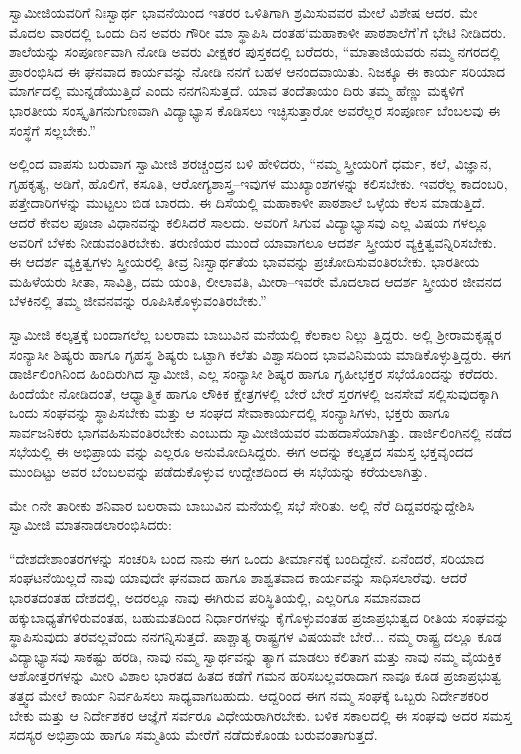 ಸ್ವಾಮೀಜಿಯವರಿಗೆ ನಿಃಸ್ವಾರ್ಥ ಭಾವನೆಯಿಂದ ಇತರರ ಒಳಿತಿಗಾಗಿ ಶ್ರಮಿಸುವವರ ಮೇಲೆ ವಿಶೇಷ ಆದರ. ಮೇ ಮೊದಲ ವಾರದಲ್ಲಿ ಒಂದು ದಿನ ಅವರು ಗೌರೀ ಮಾ ಸ್ಥಾಪಿಸಿ ದಂತಹ‘ಮಹಾಕಾಳೀ ಪಾಠಶಾಲೆಗೆ’ಗೆ ಭೇಟಿ ನೀಡಿದರು. ಶಾಲೆಯನ್ನು ಸಂಪೂರ್ಣವಾಗಿ ನೋಡಿ ಅವರು ವೀಕ್ಷಕರ ಪುಸ್ತಕದಲ್ಲಿ ಬರೆದರು, “ಮಾತಾಜಿಯವರು ನಮ್ಮ ನಗರದಲ್ಲಿ ಪ್ರಾರಂಭಿಸಿದ ಈ ಘನವಾದ ಕಾರ್ಯವನ್ನು ನೋಡಿ ನನಗೆ ಬಹಳ ಆನಂದವಾಯಿತು. ನಿಜಕ್ಕೂ ಈ ಕಾರ್ಯ ಸರಿಯಾದ ಮಾರ್ಗದಲ್ಲಿ ಮುನ್ನಡೆಯುತ್ತಿದೆ ಎಂದು ನನಗನಿಸುತ್ತದೆ. ಯಾವ ತಂದೆತಾಯಂ ದಿರು ತಮ್ಮ ಹೆಣ್ಣು ಮಕ್ಕಳಿಗೆ ಭಾರತೀಯ ಸಂಸ್ಕೃತಿಗನುಗುಣವಾಗಿ ವಿದ್ಯಾಭ್ಯಾಸ ಕೊಡಿಸಲು ಇಚ್ಛಿಸುತ್ತಾರೋ ಅವರೆಲ್ಲರ ಸಂಪೂರ್ಣ ಬೆಂಬಲವು ಈ ಸಂಸ್ಥೆಗೆ ಸಲ್ಲಬೇಕು.”

ಅಲ್ಲಿಂದ ವಾಪಸು ಬರುವಾಗ ಸ್ವಾಮೀಜಿ ಶರಚ್ಚಂದ್ರನ ಬಳಿ ಹೇಳಿದರು, “ನಮ್ಮ ಸ್ತ್ರೀಯರಿಗೆ ಧರ್ಮ, ಕಲೆ, ವಿಜ್ಞಾನ, ಗೃಹಕೃತ್ಯ, ಅಡಿಗೆ, ಹೊಲಿಗೆ, ಕಸೂತಿ, ಆರೋಗ್ಯಶಾಸ್ತ್ರ–ಇವುಗಳ ಮುಖ್ಯಾಂಶಗಳನ್ನು ಕಲಿಸಬೇಕು. ಇವರೆಲ್ಲ ಕಾದಂಬರಿ, ಪತ್ತೇದಾರಿಗಳನ್ನು ಮುಟ್ಟಲು ಬಿಡ ಬಾರದು. ಈ ದಿಸೆಯಲ್ಲಿ ಮಹಾಕಾಳೀ ಪಾಠಶಾಲೆ ಒಳ್ಳೆಯ ಕೆಲಸ ಮಾಡುತ್ತಿದೆ. ಆದರೆ ಕೇವಲ ಪೂಜಾ ವಿಧಾನವನ್ನು ಕಲಿಸಿದರೆ ಸಾಲದು. ಅವರಿಗೆ ಸಿಗುವ ವಿದ್ಯಾಭ್ಯಾಸವು ಎಲ್ಲ ವಿಷಯ ಗಳಲ್ಲೂ ಅವರಿಗೆ ಬೆಳಕು ನೀಡುವಂತಿರಬೇಕು. ತರುಣಿಯರ ಮುಂದೆ ಯಾವಾಗಲೂ ಆದರ್ಶ ಸ್ತ್ರೀಯರ ವ್ಯಕ್ತಿತ್ವವನ್ನಿರಿಸಬೇಕು. ಈ ಆದರ್ಶ ವ್ಯಕ್ತಿತ್ವಗಳು ಸ್ತ್ರೀಯರಲ್ಲಿ ತೀವ್ರ ನಿಃಸ್ವಾರ್ಥತೆಯ ಭಾವವನ್ನು ಪ್ರಚೋದಿಸುವಂತಿರಬೇಕು. ಭಾರತೀಯ ಮಹಿಳೆಯರು ಸೀತಾ, ಸಾವಿತ್ರಿ, ದಮ ಯಂತಿ, ಲೀಲಾವತಿ, ಮೀರಾ–ಇವರೇ ಮೊದಲಾದ ಆದರ್ಶ ಸ್ತ್ರೀಯರ ಜೀವನದ ಬೆಳಕಿನಲ್ಲಿ ತಮ್ಮ ಜೀವನವನ್ನು ರೂಪಿಸಿಕೊಳ್ಳುವಂತಿರಬೇಕು.”

ಸ್ವಾಮೀಜಿ ಕಲ್ಕತ್ತಕ್ಕೆ ಬಂದಾಗಲೆಲ್ಲ ಬಲರಾಮ ಬಾಬುವಿನ ಮನೆಯಲ್ಲಿ ಕೆಲಕಾಲ ನಿಲ್ಲು ತ್ತಿದ್ದರು. ಅಲ್ಲಿ ಶ್ರೀರಾಮಕೃಷ್ಣರ ಸಂನ್ಯಾಸೀ ಶಿಷ್ಯರು ಹಾಗೂ ಗೃಹಸ್ಥ ಶಿಷ್ಯರು ಒಟ್ಟಾಗಿ ಕಲೆತು ವಿಶ್ವಾಸದಿಂದ ಭಾವವಿನಿಮಯ ಮಾಡಿಕೊಳ್ಳುತ್ತಿದ್ದರು. ಈಗ ಡಾರ್ಜಿಲಿಂಗಿನಿಂದ ಹಿಂದಿರುಗಿದ ಸ್ವಾಮೀಜಿ, ಎಲ್ಲ ಸಂನ್ಯಾಸೀ ಶಿಷ್ಯರ ಹಾಗೂ ಗೃಹೀಭಕ್ತರ ಸಭೆಯೊಂದನ್ನು ಕರೆದರು. ಹಿಂದೆಯೇ ನೋಡಿದಂತೆ, ಆಧ್ಯಾತ್ಮಿಕ ಹಾಗೂ ಲೌಕಿಕ ಕ್ಷೇತ್ರಗಳಲ್ಲಿ ಬೇರೆ ಬೇರೆ ಸ್ತರಗಳಲ್ಲಿ ಜನಸೇವೆ ಸಲ್ಲಿಸುವುದಕ್ಕಾಗಿ ಒಂದು ಸಂಘವನ್ನು ಸ್ಥಾಪಿಸಬೇಕು ಮತ್ತು ಆ ಸಂಘದ ಸೇವಾಕಾರ್ಯದಲ್ಲಿ ಸಂನ್ಯಾಸಿಗಳು, ಭಕ್ತರು ಹಾಗೂ ಸಾರ್ವಜನಿಕರು ಭಾಗವಹಿಸುವಂತಿರಬೇಕು ಎಂಬುದು ಸ್ವಾಮೀಜಿಯವರ ಮಹದಾಸೆಯಾಗಿತ್ತು. ಡಾರ್ಜಿಲಿಂಗಿನಲ್ಲಿ ನಡೆದ ಸಭೆಯಲ್ಲಿ ಈ ಅಭಿಪ್ರಾಯ ವನ್ನು ಎಲ್ಲರೂ ಅನುಮೋದಿಸಿದ್ದರು. ಈಗ ಅದನ್ನು ಕಲ್ಕತ್ತದ ಸಮಸ್ತ ಭಕ್ತವೃಂದದ ಮುಂದಿಟ್ಟು ಅವರ ಬೆಂಬಲವನ್ನು ಪಡೆದುಕೊಳ್ಳುವ ಉದ್ದೇಶದಿಂದ ಈ ಸಭೆಯನ್ನು ಕರೆಯಲಾಗಿತ್ತು.

ಮೇ ೧ನೇ ತಾರೀಕು ಶನಿವಾರ ಬಲರಾಮ ಬಾಬುವಿನ ಮನೆಯಲ್ಲಿ ಸಭೆ ಸೇರಿತು. ಅಲ್ಲಿ ನೆರೆ ದಿದ್ದವರನ್ನುದ್ದೇಶಿಸಿ ಸ್ವಾಮೀಜಿ ಮಾತನಾಡಲಾರಂಭಿಸಿದರು:

“ದೇಶದೇಶಾಂತರಗಳನ್ನು ಸಂಚರಿಸಿ ಬಂದ ನಾನು ಈಗ ಒಂದು ತೀರ್ಮಾನಕ್ಕೆ ಬಂದಿದ್ದೇನೆ. ಏನೆಂದರೆ, ಸರಿಯಾದ ಸಂಘಟನೆಯಿಲ್ಲದೆ ನಾವು ಯಾವುದೇ ಘನವಾದ ಹಾಗೂ ಶಾಶ್ವತವಾದ ಕಾರ್ಯವನ್ನು ಸಾಧಿಸಲಾರೆವು. ಆದರೆ ಭಾರತದಂತಹ ದೇಶದಲ್ಲಿ, ಅದರಲ್ಲೂ ನಾವು ಈಗಿರುವ ಪರಿಸ್ಥಿತಿಯಲ್ಲಿ, ಎಲ್ಲರಿಗೂ ಸಮಾನವಾದ ಹಕ್ಕುಬಾಧ್ಯತೆಗಳಿರುವಂತಹ, ಬಹುಮತದಿಂದ ನಿರ್ಧಾರಗಳನ್ನು ಕೈಗೊಳ್ಳುವಂತಹ ಪ್ರಜಾಪ್ರಭುತ್ವದ ರೀತಿಯ ಸಂಘವನ್ನು ಸ್ಥಾಪಿಸುವುದು ತರವಲ್ಲವೆಂದು ನನಗನ್ನಿಸುತ್ತದೆ. ಪಾಶ್ಚಾತ್ಯ ರಾಷ್ಟ್ರಗಳ ವಿಷಯವೇ ಬೇರೆ... ನಮ್ಮ ರಾಷ್ಟ್ರ ದಲ್ಲೂ ಕೂಡ ವಿದ್ಯಾಭ್ಯಾಸವು ಸಾಕಷ್ಟು ಹರಡಿ, ನಾವು ನಮ್ಮ ಸ್ವಾರ್ಥವನ್ನು ತ್ಯಾಗ ಮಾಡಲು ಕಲಿತಾಗ ಮತ್ತು ನಾವು ನಮ್ಮ ವೈಯಕ್ತಿಕ ಆಶೋತ್ತರಗಳನ್ನು ಮೀರಿ ವಿಶಾಲ ಭಾರತದ ಹಿತದ ಕಡೆಗೆ ಗಮನ ಹರಿಸಬಲ್ಲವರಾದಾಗ ನಾವೂ ಕೂಡ ಪ್ರಜಾಪ್ರಭುತ್ವ ತತ್ತ್ವದ ಮೇಲೆ ಕಾರ್ಯ ನಿರ್ವಹಿಸಲು ಸಾಧ್ಯವಾಗಬಹುದು. ಆದ್ದರಿಂದ ಈಗ ನಮ್ಮ ಸಂಘಕ್ಕೆ ಒಬ್ಬರು ನಿರ್ದೇಶಕರಿರ ಬೇಕು ಮತ್ತು ಆ ನಿರ್ದೇಶಕರ ಆಜ್ಞೆಗೆ ಸರ್ವರೂ ವಿಧೇಯರಾಗಿರಬೇಕು. ಬಳಿಕ ಸಕಾಲದಲ್ಲಿ ಈ ಸಂಘವು ಅದರ ಸಮಸ್ತ ಸದಸ್ಯರ ಅಭಿಪ್ರಾಯ ಹಾಗೂ ಸಮ್ಮತಿಯ ಮೇರೆಗೆ ನಡೆದುಕೊಂಡು ಬರುವಂತಾಗುತ್ತದೆ.


